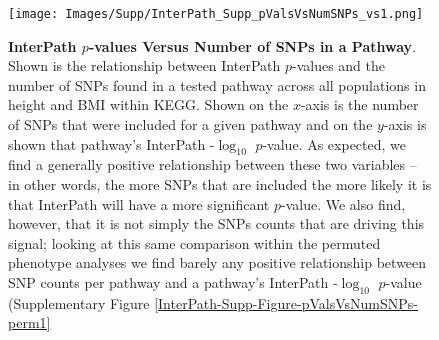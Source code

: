 \documentclass[12pt, a4paper]{article}
\begin{document}
\begin{figure}[htbp]
\centering
\texttt{[image: Images/Supp/InterPath\_Supp\_pValsVsNumSNPs\_vs1.png]}
\caption[TBD]{\textbf{InterPath $p$-values Versus Number of SNPs in a Pathway}. \\ Shown is the relationship between InterPath $p$-values and the number of SNPs found in a tested pathway across all populations in height and BMI within KEGG. Shown on the $x$-axis is the number of SNPs that were included for a given pathway and on the $y$-axis is shown that pathway's InterPath -$\log_{10}$ $p$-value. As expected, we find a generally positive relationship between these two variables -- in other words, the more SNPs that are included the more likely it is that InterPath will have a more significant $p$-value. We also find, however, that it is not simply the SNPs counts that are driving this signal; looking at this same comparison within the permuted phenotype analyses we find barely any positive relationship between SNP counts per pathway and a pathway's InterPath -$\log_{10}$ $p$-value (Supplementary Figure \ref{InterPath-Supp-Figure-pValsVsNumSNPs-perm1}}
\label{InterPath-Supp-Figure-pValsVsNumSNPs}
\end{figure}

\end{document}

